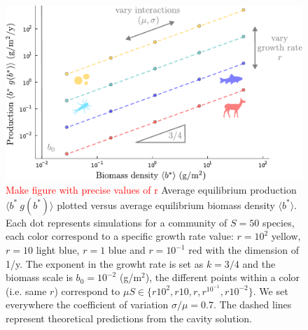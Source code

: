 \documentclass[10pt]{article}
\begin{document}
\begin{figure}[h!]
    \centering
    \includegraphics[width=.8\textwidth]{fig/SM-production.pdf}
    \caption{\textcolor{red}{Make figure with precise values of r} 
    Average equilibrium production $\langle b^* \ g(b^*)\rangle$ 
    plotted versus average equilibrium biomass density $\langle b^*\rangle$.
    Each dot represents simulations for a community of $S=50$ species, each color
    correspond to a specific growth rate value: $r=10^2$ yellow, $r=10$ light blue,
    $r = 1$ blue and $r= 10 ^{-1}$ red with the dimension of 1/y.
    The exponent in the growht rate
    is set as $k=3/4$ and the biomass scale is $b_0=10^{-2}$ (g/$\textrm{m}^2$),
    the different points within a color (i.e. same $r$) correspond to 
    $\mu S \in \{r10^2, r10, r, r^10^{-1}, r10^{-2}\}$. 
    We set everywhere the coefficient of variation $\sigma/\mu=0.7$.
    The dashed lines represent theoretical predictions from the
    cavity solution.}
    \label{fig: SM production}
\end{figure}
\end{document}
